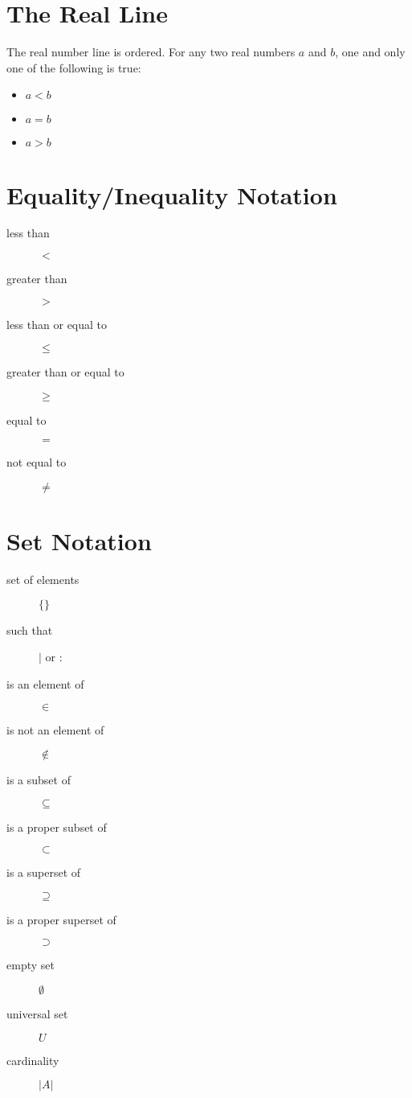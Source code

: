 \section{The Real Line}

The real number line is ordered. For any two real numbers $a$ and $b$, one and only one of the following is true:
\begin{itemize}
    \item $a < b$
    \item $a = b$
    \item $a > b$
\end{itemize}

\section{Equality/Inequality Notation}
\begin{description}
    \item[less than] $<$
    \item[greater than] $>$
    \item[less than or equal to] $\leq$
    \item[greater than or equal to] $\geq$
    \item[equal to] $=$
    \item[not equal to] $\neq$
\end{description}

\section{Set Notation}
\begin{description}
    \item[set of elements] $\{\}$
    \item[such that] $\mid$ or $:$
    \item[is an element of] $\in$
    \item[is not an element of] $\notin$
    \item[is a subset of] $\subseteq$
    \item[is a proper subset of] $\subset$
    \item[is a superset of] $\supseteq$
    \item[is a proper superset of] $\supset$
    \item[empty set] $\emptyset$
    \item[universal set] $U$
    \item[cardinality] $|A|$
\end{description}

